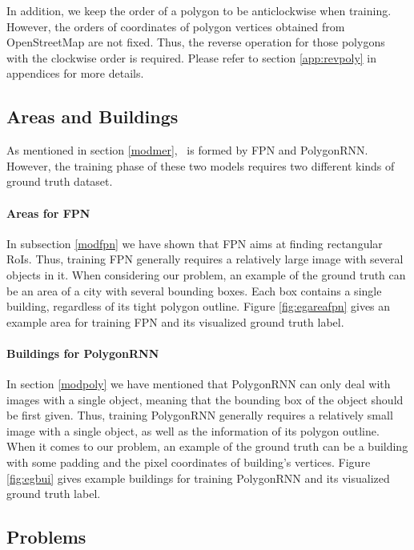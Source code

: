 In addition, we keep the order of a polygon to be anticlockwise when training. However, the orders of coordinates of polygon vertices obtained from OpenStreetMap are not fixed. Thus, the reverse operation for those polygons with the clockwise order is required. Please refer to section \ref{app:revpoly} in appendices for more details.

\subsection{Areas and Buildings}\label{arebui}

As mentioned in section \ref{modmer}, \modelnameshort\ is formed by FPN and PolygonRNN. However, the training phase of these two models requires two different kinds of ground truth dataset.

\paragraph{Areas for FPN}
In subsection \ref{modfpn} we have shown that FPN aims at finding rectangular RoIs. Thus, training FPN generally requires a relatively large image with several objects in it. When considering our problem, an example of the ground truth can be an area of a city with several bounding boxes. Each box contains a single building, regardless of its tight polygon outline. Figure \ref{fig:egareafpn} gives an example area for training FPN and its visualized ground truth label.



\paragraph{Buildings for PolygonRNN}
In section \ref{modpoly} we have mentioned that PolygonRNN can only deal with images with a single object, meaning that the bounding box of the object should be first given. Thus, training PolygonRNN generally requires a relatively small image with a single object, as well as the information of its polygon outline. When it comes to our problem, an example of the ground truth can be a building with some padding and the pixel coordinates of building's vertices. Figure \ref{fig:egbui} gives example buildings for training PolygonRNN and its visualized ground truth label.



\subsection{Problems}\label{proble}

